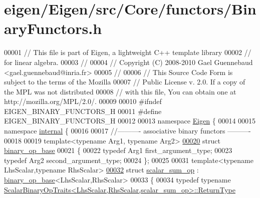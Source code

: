 \hypertarget{eigen_2_eigen_2src_2_core_2functors_2_binary_functors_8h_source}{}\section{eigen/\+Eigen/src/\+Core/functors/\+Binary\+Functors.h}
\label{eigen_2_eigen_2src_2_core_2functors_2_binary_functors_8h_source}

\begin{DoxyCode}
00001 \textcolor{comment}{// This file is part of Eigen, a lightweight C++ template library}
00002 \textcolor{comment}{// for linear algebra.}
00003 \textcolor{comment}{//}
00004 \textcolor{comment}{// Copyright (C) 2008-2010 Gael Guennebaud <gael.guennebaud@inria.fr>}
00005 \textcolor{comment}{//}
00006 \textcolor{comment}{// This Source Code Form is subject to the terms of the Mozilla}
00007 \textcolor{comment}{// Public License v. 2.0. If a copy of the MPL was not distributed}
00008 \textcolor{comment}{// with this file, You can obtain one at http://mozilla.org/MPL/2.0/.}
00009 
00010 \textcolor{preprocessor}{#ifndef EIGEN\_BINARY\_FUNCTORS\_H}
00011 \textcolor{preprocessor}{#define EIGEN\_BINARY\_FUNCTORS\_H}
00012 
00013 \textcolor{keyword}{namespace }\hyperlink{namespace_eigen}{Eigen} \{
00014 
00015 \textcolor{keyword}{namespace }\hyperlink{namespaceinternal}{internal} \{
00016 
00017 \textcolor{comment}{//---------- associative binary functors ----------}
00018 
00019 \textcolor{keyword}{template}<\textcolor{keyword}{typename} Arg1, \textcolor{keyword}{typename} Arg2>
\hyperlink{struct_eigen_1_1internal_1_1binary__op__base}{00020} \textcolor{keyword}{struct }\hyperlink{struct_eigen_1_1internal_1_1binary__op__base}{binary\_op\_base}
00021 \{
00022   \textcolor{keyword}{typedef} Arg1 first\_argument\_type;
00023   \textcolor{keyword}{typedef} Arg2 second\_argument\_type;
00024 \};
00025 
00031 \textcolor{keyword}{template}<\textcolor{keyword}{typename} LhsScalar,\textcolor{keyword}{typename} RhsScalar>
\hyperlink{struct_eigen_1_1internal_1_1scalar__sum__op}{00032} \textcolor{keyword}{struct }\hyperlink{struct_eigen_1_1internal_1_1scalar__sum__op}{scalar\_sum\_op} : \hyperlink{struct_eigen_1_1internal_1_1binary__op__base}{binary\_op\_base}<LhsScalar,RhsScalar>
00033 \{
00034   \textcolor{keyword}{typedef} \textcolor{keyword}{typename} 
      \hyperlink{group___core___module_struct_eigen_1_1_scalar_binary_op_traits}{ScalarBinaryOpTraits<LhsScalar,RhsScalar,scalar\_sum\_op>::ReturnType}

\end{DoxyCode}
